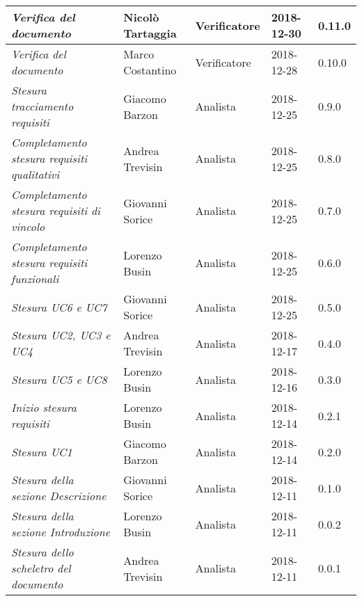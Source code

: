 \begin{longtable}{p{4cm}|C{3cm}|C{3cm}|R{2.5cm}|R{2cm}}
		\emph{Verifica del documento} & Nicolò Tartaggia & Verificatore & 2018-12-30 & 0.11.0 \\
		\hline
		
		\emph{Verifica del documento} & Marco Costantino & Verificatore & 2018-12-28 & 0.10.0 \\
		\hline
		
		\emph{Stesura tracciamento requisiti} & Giacomo Barzon & Analista & 2018-12-25 & 0.9.0 \\
		\hline
		
		\emph{Completamento stesura requisiti qualitativi} & Andrea Trevisin & Analista & 2018-12-25 & 0.8.0 \\
		\hline
		
		\emph{Completamento stesura requisiti di vincolo} & Giovanni Sorice & Analista & 2018-12-25 & 0.7.0 \\
		\hline
		
		\emph{Completamento stesura requisiti funzionali} & Lorenzo Busin & Analista & 2018-12-25 & 0.6.0 \\
		\hline
		
		\emph{Stesura UC6 e UC7} & Giovanni Sorice & Analista & 2018-12-25 & 0.5.0 \\
		\hline
		
		\emph{Stesura UC2, UC3 e UC4} & Andrea Trevisin & Analista & 2018-12-17 & 0.4.0 \\
		\hline
		
		\emph{Stesura UC5 e UC8} & Lorenzo Busin & Analista & 2018-12-16 & 0.3.0 \\
		\hline
		
		\emph{Inizio stesura requisiti} & Lorenzo Busin & Analista & 2018-12-14 & 0.2.1 \\
		\hline
		
		\emph{Stesura UC1} & Giacomo Barzon & Analista & 2018-12-14 & 0.2.0 \\
		\hline
		
		\emph{Stesura della sezione Descrizione } & Giovanni Sorice & Analista & 2018-12-11 & 0.1.0 \\
		\hline
		
		\emph{Stesura della sezione Introduzione } & Lorenzo Busin & Analista & 2018-12-11 & 0.0.2 \\
		\hline
		
		\emph{Stesura dello scheletro del documento} & Andrea Trevisin & Analista & 2018-12-11 & 0.0.1 \\
		
	\end{longtable}



\clearpage